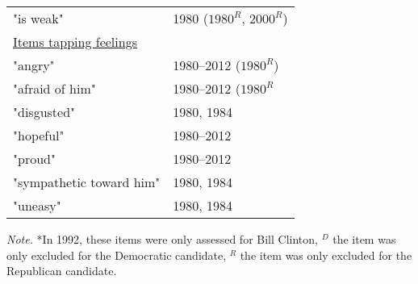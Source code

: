\documentclass[10pt]{article}
\begin{document}
\begin{table}[t]
\begin{threeparttable}
\begin{tabular}{ll}
"is weak" &	1980 ($1980^{R}$, $2000^{R}$)\\
         \multicolumn{2}{l}{\underline{Items tapping feelings}}\\       
"angry" &	1980--2012 ($1980^{R}$)\\
"afraid of him" &	1980--2012 ($1980^{R}$\\
"disgusted" &	1980, 1984\\
"hopeful" &	1980--2012\\
"proud" &	1980--2012\\
"sympathetic toward him" &	1980, 1984\\	
"uneasy" &	1980, 1984\\
        \bottomrule
     \end{tabular}
    \begin{tablenotes}
      \item\textit{Note.} *In 1992, these items were only assessed for Bill Clinton, $^{D}$ the item was only excluded for the Democratic candidate, $^{R}$ the item was only excluded for the Republican candidate.
    \end{tablenotes}
  \end{threeparttable}
\end{table}
\end{document}
